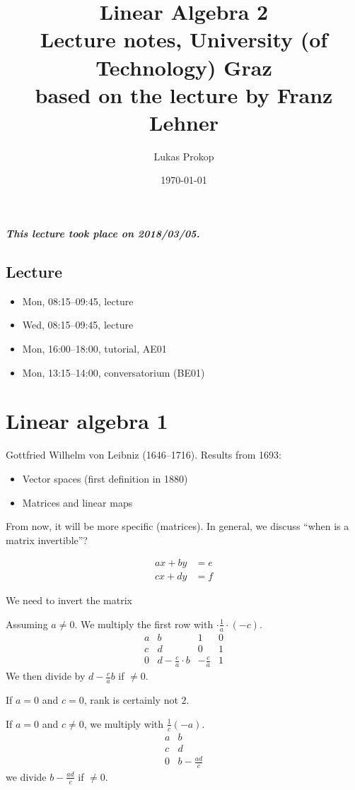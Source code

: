 \documentclass{article}
\title{
  Linear Algebra 2 \\
  \large{Lecture notes, University (of Technology) Graz} \\
  based on the lecture by Franz Lehner
}
\date{\today}
\author{Lukas Prokop}
\newcommand{\dateref}[1]{\paragraph{\textit{This lecture took place on #1.}}}
\begin{document}
\maketitle
\tableofcontents

\dateref{2018/03/05}
\subsection{Lecture}

\begin{itemize}
  \item Mon, 08:15--09:45, lecture
  \item Wed, 08:15--09:45, lecture
  \item Mon, 16:00--18:00, tutorial, AE01
  \item Mon, 13:15--14:00, conversatorium (BE01)
\end{itemize}

\section{Linear algebra 1}

Gottfried Wilhelm von Leibniz (1646--1716). Results from 1693:

\begin{itemize}
  \item Vector spaces (first definition in 1880)
  \item Matrices and linear maps
\end{itemize}

From now, it will be more specific (matrices). In general, we discuss \enquote{when is a matrix invertible}?

\begin{align*}
  ax + by &= e \\
  cx + dy &= f
\end{align*}

We need to invert the matrix

Assuming $a \neq 0$. We multiply the first row with $\cdot \frac1a \cdot (-c)$.
\[
  \begin{array}{cc|cc}
    a & b & 1 & 0 \\
    c & d & 0 & 1 \\
  \hline
    0 & d-\frac ca \cdot b & -\frac ca & 1
  \end{array}
\]
We then divide by $d - \frac ca b$ if $\neq 0$.

If $a=0$ and $c=0$, rank is certainly not $2$.

If $a=0$ and $c \neq 0$, we multiply with $\frac1c (-a)$.
\[
  \begin{array}{cc}
    a & b \\
    c & d \\
  \hline
    0 & b-\frac{ad}{c}
  \end{array}
\]
we divide $b - \frac{ad}{c}$ if $\neq 0$.
\end{document}
